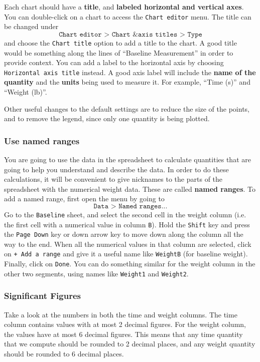 Each chart should have a \textbf{title}, and \textbf{labeled horizontal and vertical axes}. You can double-click on a chart to access the \texttt{Chart editor} menu. The title can be changed under
\begin{equation}
    \texttt{Chart editor > Chart \& axis titles > Type}
\end{equation}
and choose the \texttt{Chart title} option to add a title to the chart. A good title would be something along the lines of ``Baseline Measurement'' in order to provide context. You can add a label to the horizontal axis by choosing \texttt{Horizontal axis title} instead. A good axis label will include the \textbf{name of the quantity} and the \textbf{units} being used to measure it. For example, ``Time (s)'' and ``Weight (lb)''.

Other useful changes to the default settings are to reduce the size of the points, and to remove the legend, since only one quantity is being plotted.
\subsubsection{Use named ranges}
You are going to use the data in the spreadsheet to calculate quantities that are going to help you understand and describe the data. In order to do these calculations, it will be convenient to give nicknames to the parts of the spreadsheet with the numerical weight data. These are called \textbf{named ranges}. To add a named range, first open the menu by going to
\begin{equation}
    \texttt{Data > Named ranges...}
\end{equation}
Go to the \texttt{Baseline} sheet, and select the second cell in the weight column (i.e. the first cell with a numerical value in column \texttt{B}). Hold the \texttt{Shift} key and press the \texttt{Page Down} key or down arrow key to move down along the column all the way to the end. When all the numerical values in that column are selected, click on \texttt{+ Add a range} and give it a useful name like \texttt{WeightB} (for baseline weight). Finally, click on \texttt{Done}. You can do something similar for the weight column in the other two segments, using names like \texttt{Weight1} and \texttt{Weight2}.
\subsubsection{Significant Figures}
Take a look at the numbers in both the time and weight columns. The time column contains values with at most 2 decimal figures. For the weight column, the values have at most 6 decimal figures. This means that any time quantity that we compute should be rounded to 2 decimal places, and any weight quantity should be rounded to 6 decimal places.
